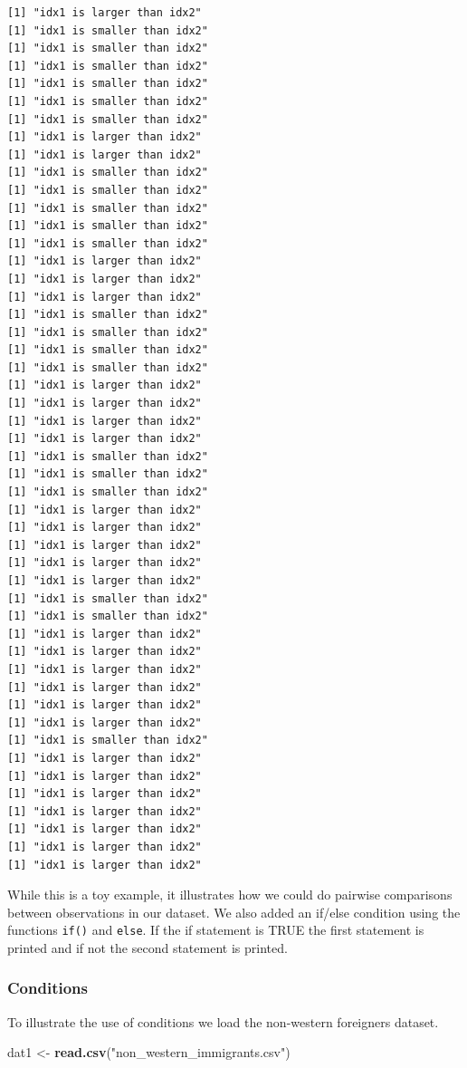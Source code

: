 \documentclass[]{article}
\newenvironment{Shaded}{\begin{snugshade}}{\end{snugshade}}
\newcommand{\KeywordTok}[1]{\textcolor[rgb]{0.13,0.29,0.53}{\textbf{#1}}}
\newcommand{\NormalTok}[1]{#1}
\newcommand{\StringTok}[1]{\textcolor[rgb]{0.31,0.60,0.02}{#1}}
\begin{document}
\begin{verbatim}
[1] "idx1 is larger than idx2"
[1] "idx1 is smaller than idx2"
[1] "idx1 is smaller than idx2"
[1] "idx1 is smaller than idx2"
[1] "idx1 is smaller than idx2"
[1] "idx1 is smaller than idx2"
[1] "idx1 is smaller than idx2"
[1] "idx1 is larger than idx2"
[1] "idx1 is larger than idx2"
[1] "idx1 is smaller than idx2"
[1] "idx1 is smaller than idx2"
[1] "idx1 is smaller than idx2"
[1] "idx1 is smaller than idx2"
[1] "idx1 is smaller than idx2"
[1] "idx1 is larger than idx2"
[1] "idx1 is larger than idx2"
[1] "idx1 is larger than idx2"
[1] "idx1 is smaller than idx2"
[1] "idx1 is smaller than idx2"
[1] "idx1 is smaller than idx2"
[1] "idx1 is smaller than idx2"
[1] "idx1 is larger than idx2"
[1] "idx1 is larger than idx2"
[1] "idx1 is larger than idx2"
[1] "idx1 is larger than idx2"
[1] "idx1 is smaller than idx2"
[1] "idx1 is smaller than idx2"
[1] "idx1 is smaller than idx2"
[1] "idx1 is larger than idx2"
[1] "idx1 is larger than idx2"
[1] "idx1 is larger than idx2"
[1] "idx1 is larger than idx2"
[1] "idx1 is larger than idx2"
[1] "idx1 is smaller than idx2"
[1] "idx1 is smaller than idx2"
[1] "idx1 is larger than idx2"
[1] "idx1 is larger than idx2"
[1] "idx1 is larger than idx2"
[1] "idx1 is larger than idx2"
[1] "idx1 is larger than idx2"
[1] "idx1 is larger than idx2"
[1] "idx1 is smaller than idx2"
[1] "idx1 is larger than idx2"
[1] "idx1 is larger than idx2"
[1] "idx1 is larger than idx2"
[1] "idx1 is larger than idx2"
[1] "idx1 is larger than idx2"
[1] "idx1 is larger than idx2"
[1] "idx1 is larger than idx2"
\end{verbatim}

While this is a toy example, it illustrates how we could do pairwise comparisons between observations in our dataset. We also added an if/else condition using the functions \texttt{if()} and \texttt{else}. If the if statement is TRUE the first statement is printed and if not the second statement is printed.

\hypertarget{conditions}{%
\subsubsection{Conditions}\label{conditions}}

To illustrate the use of conditions we load the non-western foreigners dataset.

\begin{Shaded}
\begin{Highlighting}[]
\NormalTok{dat1 <-}\StringTok{ }\KeywordTok{read.csv}\NormalTok{(}\StringTok{"non_western_immigrants.csv"}\NormalTok{)}
\end{Highlighting}
\end{Shaded}
\end{document}
